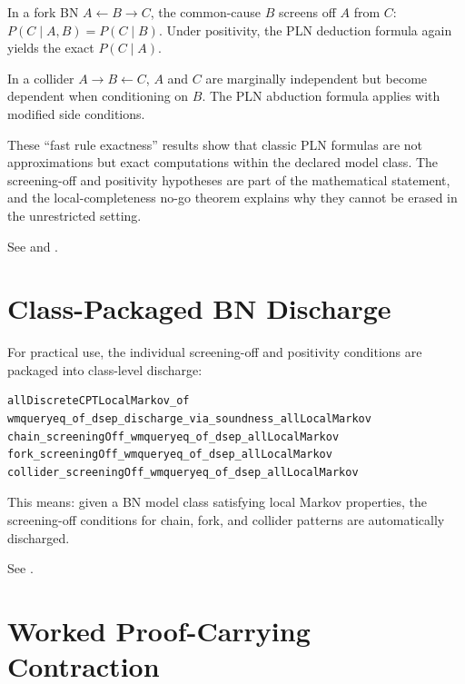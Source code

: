 \documentclass[11pt,openany]{report}
\begin{document}
\begin{theorem}
\label{thm:fork-exact}
In a fork BN $A \leftarrow B \to C$, the common-cause $B$ screens off
$A$ from $C$: $P(C \mid A, B) = P(C \mid B)$.  Under positivity, the
PLN deduction formula again yields the exact $P(C \mid A)$.
\end{theorem}

\begin{theorem}
In a collider $A \to B \leftarrow C$, $A$ and $C$ are marginally
independent but become dependent when conditioning on $B$.  The PLN
abduction formula applies with modified side conditions.
\end{theorem}

These ``fast rule exactness'' results show that classic PLN formulas are
not approximations but exact computations within the declared model class.
The screening-off and positivity hypotheses are part of the mathematical
statement, and the local-completeness no-go theorem explains why they
cannot be erased in the unrestricted setting.

See  and
.

\section{Class-Packaged BN Discharge}

For practical use, the individual screening-off and positivity conditions
are packaged into class-level discharge:
\begin{lstlisting}
allDiscreteCPTLocalMarkov_of
wmqueryeq_of_dsep_discharge_via_soundness_allLocalMarkov
chain_screeningOff_wmqueryeq_of_dsep_allLocalMarkov
fork_screeningOff_wmqueryeq_of_dsep_allLocalMarkov
collider_screeningOff_wmqueryeq_of_dsep_allLocalMarkov
\end{lstlisting}

This means: given a BN model class satisfying local Markov properties,
the screening-off conditions for chain, fork, and collider patterns are
automatically discharged.

See .

\section{Worked Proof-Carrying Contraction}
\end{document}
